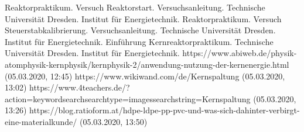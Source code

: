 \documentclass[german,  %
parskip=full,  %
]{scrartcl}
\begin{document}
    \begin{thebibliography}{9}
    Reaktorpraktikum. Versuch Reaktorstart. Versuchsanleitung. Technische Universität Dresden. Institut für Energietechnik.
    Reaktorpraktikum. Versuch Steuerstabkalibrierung. Versuchsanleitung. Technische Universität Dresden. Institut für           Energietechnik.
    Einführung Kernreaktorpraktikum. Technische Universität Dresden. Institut für           Energietechnik.
    https://www.abiweb.de/physik-atomphysik-kernphysik/kernphysik-2/anwendung-nutzung-der-kernenergie.html (05.03.2020,      12:45)
   https://www.wikiwand.com/de/Kernspaltung (05.03.2020, 13:02)
  https://www.4teachers.de/?action=keywordsearchsearchtype=imagessearchstring=Kernspaltung (05.03.2020, 13:26)
https://blog.ratioform.at/hdpe-ldpe-pp-pvc-und-was-sich-dahinter-verbirgt-eine-materialkunde/ (05.03.2020, 13:50)


    \end{thebibliography}

\end{document}
